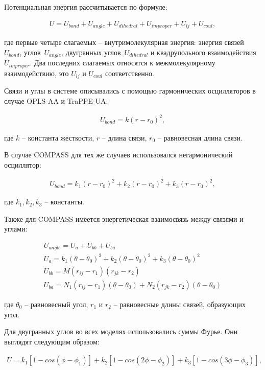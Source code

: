 Потенциальная энергия рассчитывается по формуле:

\begin{align}
	U = U_{bond} + U_{angle} + U_{dihedral} + U_{improper} + U_{lj} + U_{coul} ,
\end{align}

где первые четыре слагаемых \--- внутримолекулярная энергия: энергия связей~$U_{bond}$, углов~$U_{angle}$, двугранных углов~$U_{dihedral}$ и квадрупольного взаимодействия~$U_{improper}$. Два последних слагаемых относятся к межмолекулярному взаимодействию, это $U_{lj}$ и $U_{coul}$ соответственно. 

Связи и углы в системе описывались с помощью гармонических осцилляторов в случае OPLS-AA и TraPPE-UA:

\begin{align}
	U_{bond} = k (r - r_0)^2 ,
\end{align}

где $k$ \--- константа жесткости, $r$ \--- длина связи, $r_0$ \--- равновесная длина связи.

В случае COMPASS для тех же случаев использовался негармонический осциллятор:

\begin{align}
	U_{bond} = k_1 (r - r_0)^2 + k_2 (r - r_0)^2 + k_3 (r - r_0)^2,
\end{align}

где $k_1, k_2, k_3$ \--- константы.

Также для COMPASS имеется энергетическая взаимосвязь между связями и углами:

\begin{subequations}
    \begin{gather}
    		U_{angle} = U_a + U_{bb} + U_{ba} \\
		U_{a} = k_1 (\theta - \theta_0)^2 + k_2 (\theta - \theta_0)^2 + k_3 (\theta - \theta_0)^2 \\
		U_{bb} = M (r_{ij} - r_1 )(r_{jk} - r_2 ) \\
		U_{ba} = N_1 (r_{ij} - r_1 )(\theta - \theta_0 ) + N_2 (r_{jk} - r_2)(\theta - \theta_0)
    \end{gather}
\end{subequations}

где $\theta_0$ \--- равновесный угол, $r_1$ и $r_2$ \--- равновесные длины связей, образующих угол.

Для двугранных углов во всех моделях использовались суммы Фурье. Они выглядят следующим образом:

\begin{align}
		U = k_1 [1 - cos(\phi - \phi_1 )] + k_2 [1 - cos(2\phi - \phi_2 )] + k_3 [1 - cos(3\phi - \phi_3 )],
\end{align}


